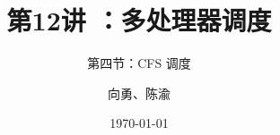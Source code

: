 


\title[第1讲]{第12讲 ：多处理器调度} %
\subtitle{第四节：CFS 调度}
\author{向勇、陈渝} %
\date{\today} %




\begin{frame}
\titlepage %
\end{frame}

%
%

